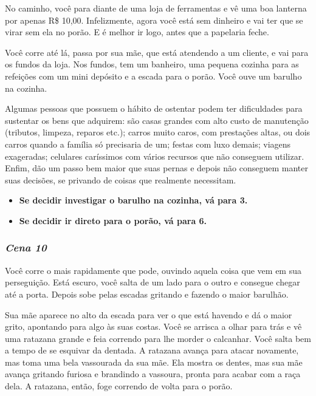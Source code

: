No caminho, você para diante de uma loja de ferramentas e vê uma boa lanterna por apenas R\$ 10,00. Infelizmente, agora você está sem dinheiro e vai ter que se virar sem ela no porão. E é melhor ir logo, antes que a papelaria feche.

Você corre até lá, passa por sua mãe, que está atendendo a um cliente, e vai para os fundos da loja. Nos fundos, tem um banheiro, uma pequena cozinha para as refeições com um mini depósito e a escada para o porão. Você ouve um barulho na cozinha.

Algumas pessoas que possuem o hábito de ostentar podem ter dificuldades para sustentar os bens que adquirem: são casas grandes com alto custo de manutenção (tributos, limpeza, reparos etc.); carros muito caros, com prestações altas, ou dois carros quando a família só precisaria de um; festas com luxo demais; viagens exageradas; celulares caríssimos com vários recursos que não conseguem utilizar. Enfim, dão um passo bem maior que suas pernas e depois não conseguem manter suas decisões, se privando de coisas que realmente necessitam.

\begin{itemize}
	\item \textbf{Se decidir investigar o barulho na cozinha, vá para 3.}
	\item \textbf{Se decidir ir direto para o porão, vá para 6.}
\end{itemize}

\bigskip\medskip

\subsubsection*{\textit{\textbf{Cena 10}}}
Você corre o mais rapidamente que pode, ouvindo aquela coisa que vem em sua perseguição. Está escuro, você salta de um lado para o outro e consegue chegar até a porta. Depois sobe pelas escadas gritando e fazendo o maior barulhão.

Sua mãe aparece no alto da escada para ver o que está havendo e dá o maior grito, apontando para algo às suas costas. Você se arrisca a olhar para trás e vê uma ratazana grande e feia correndo para lhe morder o calcanhar. Você salta bem a tempo de se esquivar da dentada. A ratazana avança para atacar novamente, mas toma uma bela vassourada da sua mãe. Ela mostra os dentes, mas sua mãe avança gritando furiosa e brandindo a vassoura, pronta para acabar com a raça dela. A ratazana, então, foge correndo de volta para o porão.

